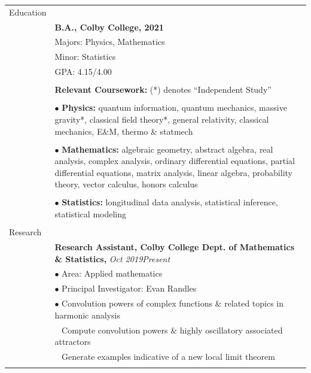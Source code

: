 \documentclass[10pt]{article}
\begin{document}
\noindent \begin{longtable}{ l m{13.5cm}   }

	
  \large{Education}    	& \\ 
  						& \textbf{B.A., Colby College, 2021} \\
     				 	& Majors: Physics, Mathematics \\
     				 	& Minor: Statistics  \\
     					& GPA: 4.15/4.00 \\
	 					& \\
	 					& \textbf{Relevant Coursework:} (*) denotes ``Independent Study'' \\ \vspace{-12pt}
	 					& \\
	 					& $\bullet$ \textbf{Physics:} quantum information, quantum mechanics, massive gravity*, classical field theory*,  general relativity, classical mechanics, E\&M, thermo \& statmech\\  \vspace{-9pt}
	 					& \\
	 					& $\bullet$ \textbf{Mathematics:} algebraic geometry, abstract algebra, real analysis, complex analysis, ordinary differential equations, partial differential equations, matrix analysis, linear algebra, probability theory, vector calculus, honors calculus\\   \vspace{-9pt}
	 					& \\ 
	 					& $\bullet$ \textbf{Statistics:} longitudinal data analysis, statistical inference,  statistical modeling\\
	 					& \\
    
        
  \large{Research}      & \\  
  						& \textbf{Research Assistant, Colby College Dept. of Mathematics \& Statistics,} \textit{Oct 2019\textendash Present }\\
  						& $\bullet$ Area: Applied mathematics \\
  						& $\bullet$ Principal Investigator: Evan Randles  \\ %
  						& $\bullet$  Convolution powers of complex functions \& related topics in harmonic analysis \\
  						& $\,\,\,$ Compute convolution powers \& highly oscillatory associated attractors\\
  						& $\,\,\,$ Generate examples indicative of a new local limit theorem\\
  						& \\
  						

\end{longtable}
\end{document}
